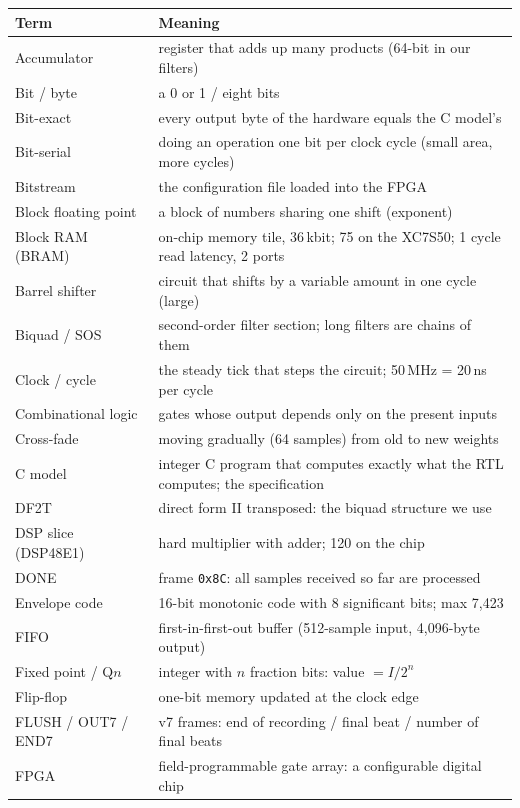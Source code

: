 \documentclass[11pt]{article}
\newcommand{\hex}[1]{\texttt{0x#1}}
\begin{document}
\begin{longtable}{@{}p{3.6cm}p{11.6cm}@{}}
\toprule
\textbf{Term} & \textbf{Meaning} \\
\midrule
\endhead
Accumulator & register that adds up many products (64-bit in our filters) \\
Bit / byte & a 0 or 1 / eight bits \\
Bit-exact & every output byte of the hardware equals the C model's \\
Bit-serial & doing an operation one bit per clock cycle (small area, more cycles) \\
Bitstream & the configuration file loaded into the FPGA \\
Block floating point & a block of numbers sharing one shift (exponent) \\
Block RAM (BRAM) & on-chip memory tile, 36\,kbit; 75 on the XC7S50; 1 cycle read latency, 2 ports \\
Barrel shifter & circuit that shifts by a variable amount in one cycle (large) \\
Biquad / SOS & second-order filter section; long filters are chains of them \\
Clock / cycle & the steady tick that steps the circuit; 50\,MHz = 20\,ns per cycle \\
Combinational logic & gates whose output depends only on the present inputs \\
Cross-fade & moving gradually (64 samples) from old to new weights \\
C model & integer C program that computes exactly what the RTL computes; the specification \\
DF2T & direct form II transposed: the biquad structure we use \\
DSP slice (DSP48E1) & hard multiplier with adder; 120 on the chip \\
DONE & frame \hex{8C}: all samples received so far are processed \\
Envelope code & 16-bit monotonic code with 8 significant bits; max 7,423 \\
FIFO & first-in-first-out buffer (512-sample input, 4,096-byte output) \\
Fixed point / Q$n$ & integer with $n$ fraction bits: value $= I/2^n$ \\
Flip-flop & one-bit memory updated at the clock edge \\
FLUSH / OUT7 / END7 & v7 frames: end of recording / final beat / number of final beats \\
FPGA & field-programmable gate array: a configurable digital chip \\

\end{longtable}
\end{document}
